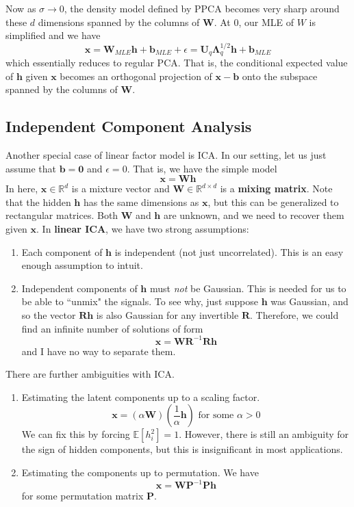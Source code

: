 \documentclass{article}
\theoremstyle{definition}
\theoremstyle{remark}
\theoremstyle{definition}
\begin{document}
Now as $\sigma \rightarrow 0$, the density model defined by PPCA becomes very sharp around these $d$ dimensions spanned by the columns of $\mathbf{W}$. At $0$, our MLE of $W$ is simplified and we have 
\[\mathbf{x} = \mathbf{W}_{MLE} \mathbf{h} + \mathbf{b}_{MLE} + \epsilon = \mathbf{U}_q \boldsymbol{\Lambda}_q^{1/2} \mathbf{h} + \mathbf{b}_{MLE} \]
which essentially reduces to regular PCA. That is, the conditional expected value of $\mathbf{h}$ given $\mathbf{x}$ becomes an orthogonal projection of $\mathbf{x} - \mathbf{b}$ onto the subspace spanned by the columns of $\mathbf{W}$.  


\subsection{Independent Component Analysis} 

Another special case of linear factor model is ICA. In our setting, let us just assume that $\mathbf{b} = \mathbf{0}$ and $\epsilon = 0$. That is, we have the simple model 
\[\mathbf{x} = \mathbf{W} \mathbf{h}\] 
In here, $\mathbf{x} \in \mathbb{R}^d$ is a mixture vector and $\mathbf{W} \in \mathbb{R}^{d \times d}$ is a \textbf{mixing matrix}. Note that the hidden $\mathbf{h}$ has the same dimensions as $\mathbf{x}$, but this can be generalized to rectangular matrices. Both $\mathbf{W}$ and $\mathbf{h}$ are unknown, and we need to recover them given $\mathbf{x}$. In \textbf{linear ICA}, we have two strong assumptions: 
\begin{enumerate} 
    \item Each component of $\mathbf{h}$ is independent (not just uncorrelated). This is an easy enough assumption to intuit.  
    \item Independent components of $\mathbf{h}$ must \textit{not} be Gaussian. This is needed for us to be able to ``unmix" the signals. To see why, just suppose $\mathbf{h}$ was Gaussian, and so the vector $\mathbf{R} \mathbf{h}$ is also Gaussian for any invertible $\mathbf{R}$. Therefore, we could find an infinite number of solutions of form 
    \[\mathbf{x} = \mathbf{W} \mathbf{R}^{-1} \mathbf{R} \mathbf{h}\]
    and I have no way to separate them. 
\end{enumerate}

There are further ambiguities with ICA. 
\begin{enumerate}
    \item Estimating the latent components up to a scaling factor. 
        \[\mathbf{x} = (\alpha \mathbf{W}) (\frac{1}{\alpha} \mathbf{h}) \text{ for some } \alpha > 0\]
        We can fix this by forcing $\mathbb{E}[h_i^2] = 1$. However, there is still an ambiguity for the sign of hidden components, but this is insignificant in most applications. 

    \item Estimating the components up to permutation. We have 
        \[\mathbf{x} = \mathbf{W} \mathbf{P}^{-1} \mathbf{P} \mathbf{h}\] 
        for some permutation matrix $\mathbf{P}$. 
\end{enumerate}
\end{document}
